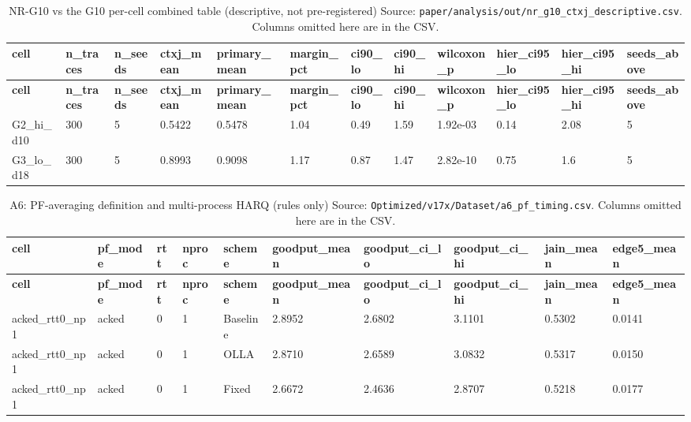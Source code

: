 \documentclass[10pt]{article}
\begin{document}
\begin{landscape}
\begin{longtable}{@{}llllllll@{}}
\bottomrule
\end{longtable}
\normalsize
\tiny
\setlength{\tabcolsep}{2pt}
\begin{longtable}{@{}llllllllllll@{}}
\caption{NR-G10 vs the G10 per-cell combined table (descriptive, not pre-registered) Source: \texttt{paper/analysis/out/nr\_g10\_ctxj\_descriptive.csv}. Columns omitted here are in the CSV.}\\
\toprule
\textbf{cell} & \textbf{n\_traces} & \textbf{n\_seeds} & \textbf{ctxj\_mean} & \textbf{primary\_mean} & \textbf{margin\_pct} & \textbf{ci90\_lo} & \textbf{ci90\_hi} & \textbf{wilcoxon\_p} & \textbf{hier\_ci95\_lo} & \textbf{hier\_ci95\_hi} & \textbf{seeds\_above} \\
\midrule
\endfirsthead
\toprule
\textbf{cell} & \textbf{n\_traces} & \textbf{n\_seeds} & \textbf{ctxj\_mean} & \textbf{primary\_mean} & \textbf{margin\_pct} & \textbf{ci90\_lo} & \textbf{ci90\_hi} & \textbf{wilcoxon\_p} & \textbf{hier\_ci95\_lo} & \textbf{hier\_ci95\_hi} & \textbf{seeds\_above} \\
\midrule
\endhead
G2\_hi\_d10 & 300 & 5 & 0.5422 & 0.5478 & 1.04 & 0.49 & 1.59 & 1.92e-03 & 0.14 & 2.08 & 5 \\
G3\_lo\_d18 & 300 & 5 & 0.8993 & 0.9098 & 1.17 & 0.87 & 1.47 & 2.82e-10 & 0.75 & 1.6 & 5 \\
\bottomrule
\end{longtable}
\normalsize
\tiny
\setlength{\tabcolsep}{2pt}
\begin{longtable}{@{}llllllllll@{}}
\caption{A6: PF-averaging definition and multi-process HARQ (rules only) Source: \texttt{Optimized/v17x/Dataset/a6\_pf\_timing.csv}. Columns omitted here are in the CSV.}\\
\toprule
\textbf{cell} & \textbf{pf\_mode} & \textbf{rtt} & \textbf{nproc} & \textbf{scheme} & \textbf{goodput\_mean} & \textbf{goodput\_ci\_lo} & \textbf{goodput\_ci\_hi} & \textbf{jain\_mean} & \textbf{edge5\_mean} \\
\midrule
\endfirsthead
\toprule
\textbf{cell} & \textbf{pf\_mode} & \textbf{rtt} & \textbf{nproc} & \textbf{scheme} & \textbf{goodput\_mean} & \textbf{goodput\_ci\_lo} & \textbf{goodput\_ci\_hi} & \textbf{jain\_mean} & \textbf{edge5\_mean} \\
\midrule
\endhead
acked\_rtt0\_np1 & acked & 0 & 1 & Baseline & 2.8952 & 2.6802 & 3.1101 & 0.5302 & 0.0141 \\
acked\_rtt0\_np1 & acked & 0 & 1 & OLLA & 2.8710 & 2.6589 & 3.0832 & 0.5317 & 0.0150 \\
acked\_rtt0\_np1 & acked & 0 & 1 & Fixed & 2.6672 & 2.4636 & 2.8707 & 0.5218 & 0.0177 \\

\end{longtable}
\end{landscape}
\end{document}
